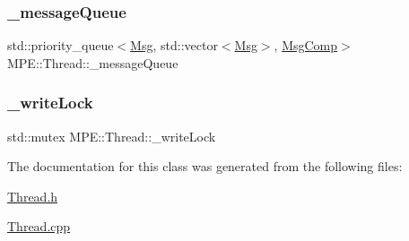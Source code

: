 \mbox{\label{class_m_p_e_1_1_thread_a1484f887be46d595bd49c84eef9911ee}} 
\subsubsection{\texorpdfstring{\+\_\+message\+Queue}{\_messageQueue}}
{\footnotesize\ttfamily std\+::priority\+\_\+queue$<$\hyperlink{struct_m_p_e_1_1_msg}{Msg}, std\+::vector$<$\hyperlink{struct_m_p_e_1_1_msg}{Msg}$>$, \hyperlink{struct_m_p_e_1_1_msg_comp}{Msg\+Comp}$>$ M\+P\+E\+::\+Thread\+::\+\_\+message\+Queue\hspace{0.3cm}{\ttfamily [protected]}}

\mbox{\label{class_m_p_e_1_1_thread_af03852c385981359d28bf776370aae3a}} 
\subsubsection{\texorpdfstring{\+\_\+write\+Lock}{\_writeLock}}
{\footnotesize\ttfamily std\+::mutex M\+P\+E\+::\+Thread\+::\+\_\+write\+Lock\hspace{0.3cm}{\ttfamily [private]}}



The documentation for this class was generated from the following files\+:\begin{DoxyCompactItemize}
\item 
\hyperlink{_thread_8h}{Thread.\+h}\item 
\hyperlink{_thread_8cpp}{Thread.\+cpp}\end{DoxyCompactItemize}
